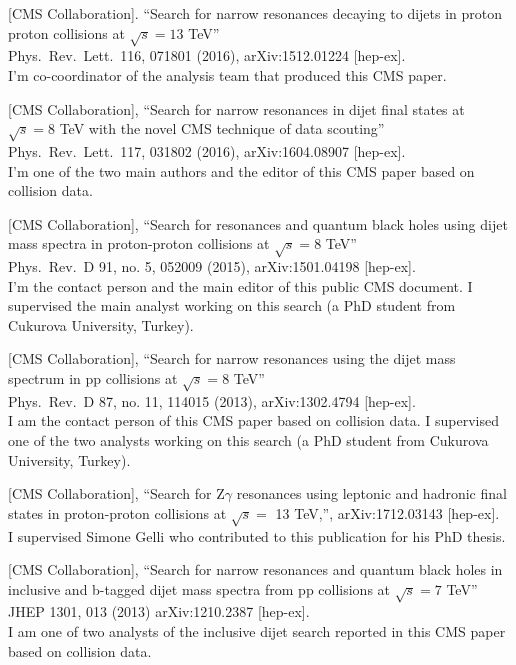 \documentclass[10pt, a4paper]{article}
\begin{document}
\begin{thebibliography}{599}
  [CMS Collaboration].
  ``Search for narrow resonances decaying to  dijets in proton
    proton collisions at $\sqrt{s}=13$ TeV''\\
  Phys.\ Rev.\ Lett.\  116, 071801 (2016), arXiv:1512.01224 [hep-ex].\\
I'm co-coordinator of the analysis team that produced this CMS paper.

[CMS Collaboration],
  ``Search for narrow resonances in dijet final states at $\sqrt{s}=8$
  TeV with the novel CMS technique of data scouting''\\
  Phys.\ Rev.\ Lett.\  117, 031802 (2016), arXiv:1604.08907 [hep-ex].
\\I'm one of the two main authors and the editor of this CMS paper based on
collision data.

  [CMS Collaboration],
  ``Search for resonances and quantum black holes using dijet mass
  spectra in proton-proton collisions at $\sqrt{s}=8$ TeV''\\
  Phys.\ Rev.\ D 91, no. 5, 052009 (2015), arXiv:1501.04198 [hep-ex].
  \\I'm the contact person and the main editor of this public CMS document. I supervised the main analyst working on this search (a PhD student from Cukurova University, Turkey).

[CMS Collaboration],
 ``Search for narrow resonances using the dijet mass spectrum in pp collisions at $\sqrt{s}=8$ TeV''\\
Phys.\ Rev.\ D 87, no. 11, 114015 (2013), arXiv:1302.4794 [hep-ex].
 \\ I am the contact person of this CMS paper based on collision data. I supervised one of the two analysts working on this search (a PhD student from Cukurova University, Turkey).  

[CMS Collaboration],
 ``Search for Z$\gamma$ resonances using leptonic and hadronic final
 states in proton-proton collisions at $\sqrt{s}=$ 13 TeV,'',
 arXiv:1712.03143 [hep-ex].
 \\ I supervised Simone Gelli who contributed to this publication for his PhD thesis.  

[CMS Collaboration],
 ``Search for narrow resonances and quantum black holes in inclusive and b-tagged dijet mass spectra from pp collisions at $\sqrt{s}=7$ TeV''\\
 JHEP 1301, 013 (2013) arXiv:1210.2387 [hep-ex].
 \\ I am one of two analysts of the inclusive dijet search reported in this CMS paper based on collision data.


\end{thebibliography}
\end{document}
